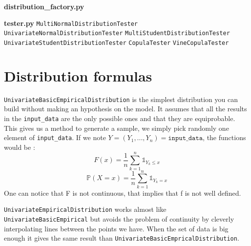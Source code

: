 \documentclass{article}
\begin{document}
	\textbf{distribution\_factory.py}\newline
	 
	
	 
	 \textbf{tester.py}
	\newline
	 \texttt{MultiNormalDistributionTester} \newline
	 \texttt{UnivariateNormalDistributionTester} \newline
	 \texttt{MultiStudentDistributionTester} \newline
	 \texttt{UnivariateStudentDistributionTester}\newline
	 \texttt{CopulaTester} \newline
	 \texttt{VineCopulaTester}
	 
	 
 	\newpage
	
	\section{Distribution formulas}
	\label{sec:distributions}
	 \texttt{UnivariateBasicEmpiricalDistribution} is the simplest distribution you can build without making an hypothesis on the model. It assumes that all the results in the \texttt{input\_data} are the only possible ones and that they are equiprobable. This gives us a method to generate a sample, we simply pick randomly one element of \texttt{input\_data}. If we note $Y = (Y_1,...,Y_n) = \texttt{input\_data}$, the functions would be :
	\begin{equation*}
  	F(x) = \frac{1}{n}\sum_{k=1}^n \mathds{1}_{Y_k\leq x}
  	\end{equation*}
  	\begin{equation*}
  	\mathbb{P}(X=x) = \frac{1}{n}\sum_{k=1}^n \mathds{1}_{Y_k = x}
  	\end{equation*}
  	One can notice that F is not continuous, that implies that f is not well defined. \newline
	 
	 \texttt{UnivariateEmpiricalDistribution} works almost like \texttt{UnivariateBasicEmpirical} but avoids the problem of continuity by cleverly interpolating lines between the points we have. When the set of data is big enough it gives the same result than \texttt{UnivariateBasicEmpricalDistribution}. \newline
	 
\end{document}
